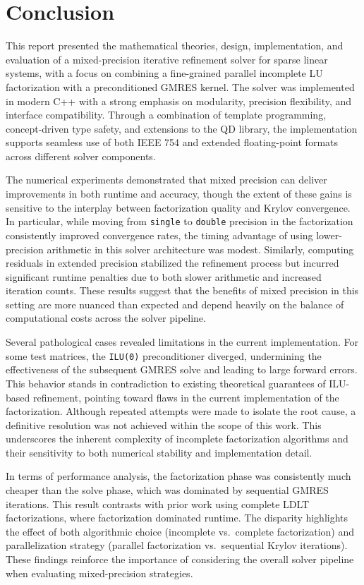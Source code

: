 \chapter{Conclusion}
\label{cha:conclusion}

This report presented the mathematical theories, design, implementation, and
evaluation of a mixed-precision iterative refinement solver for sparse linear
systems, with a focus on combining a fine-grained parallel incomplete LU
factorization with a preconditioned GMRES kernel. The solver was implemented in
modern C++ with a strong emphasis on modularity, precision flexibility, and
interface compatibility. Through a combination of template programming,
concept-driven type safety, and extensions to the QD library, the implementation
supports seamless use of both IEEE 754 and extended floating-point formats
across different solver components.

The numerical experiments demonstrated that mixed precision can deliver
improvements in both runtime and accuracy, though the extent of these gains is
sensitive to the interplay between factorization quality and Krylov convergence.
In particular, while moving from \texttt{single} to \texttt{double} precision in the
factorization consistently improved convergence rates, the timing advantage of
using lower-precision arithmetic in this solver architecture was modest.
Similarly, computing residuals in extended precision stabilized the refinement
process but incurred significant runtime penalties due to both slower arithmetic
and increased iteration counts. These results suggest that the benefits of mixed
precision in this setting are more nuanced than expected and depend heavily on
the balance of computational costs across the solver pipeline.

Several pathological cases revealed limitations in the current implementation.
For some test matrices, the \texttt{ILU(0)} preconditioner diverged, undermining
the effectiveness of the subsequent GMRES solve and leading to large forward
errors. This behavior stands in contradiction to existing theoretical guarantees
of ILU-based refinement, pointing toward flaws in the current implementation of
the factorization. Although repeated attempts were made to isolate the root
cause, a definitive resolution was not achieved within the scope of this work.
This underscores the inherent complexity of incomplete factorization algorithms
and their sensitivity to both numerical stability and implementation detail.

In terms of performance analysis, the factorization phase was consistently much
cheaper than the solve phase, which was dominated by sequential GMRES
iterations. This result contrasts with prior work using complete LDLT
factorizations, where factorization dominated runtime. The disparity highlights
the effect of both algorithmic choice (incomplete vs.\ complete factorization)
and parallelization strategy (parallel factorization vs.\ sequential Krylov
iterations). These findings reinforce the importance of considering the overall
solver pipeline when evaluating mixed-precision strategies.

